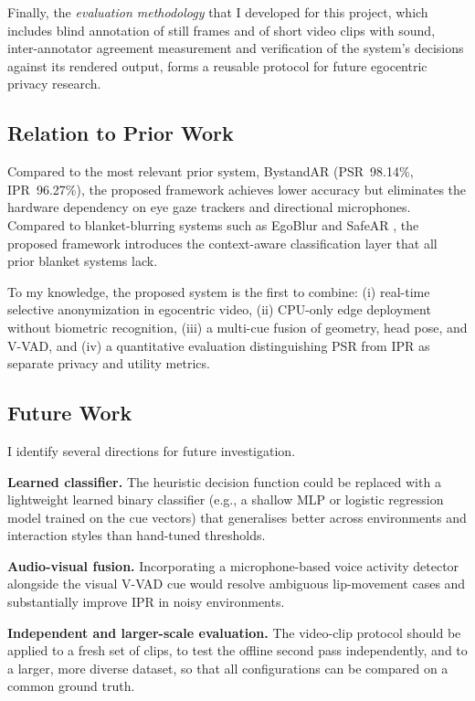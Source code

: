 Finally, the \emph{evaluation methodology} that I developed for this project,
which includes blind annotation of still frames and of short video clips with
sound, inter-annotator agreement measurement and verification of the system's
decisions against its rendered output, forms a reusable protocol for future
egocentric privacy research.

\subsection{Relation to Prior Work}
\label{sec:conclusion_prior}

Compared to the most relevant prior system, BystandAR \cite{bystandar} (PSR~98.14\%,
IPR~96.27\%), the proposed framework achieves lower accuracy but eliminates the
hardware dependency on eye gaze trackers and directional microphones. Compared to
blanket-blurring systems such as EgoBlur \cite{egoblur2023} and SafeAR
\cite{ref:safear2025}, the proposed framework introduces the context-aware
classification layer that all prior blanket systems lack.

To my knowledge, the proposed system is the first to combine:
(i) real-time selective anonymization in egocentric video,
(ii) CPU-only edge deployment without biometric recognition,
(iii) a multi-cue fusion of geometry, head pose, and V-VAD, and
(iv) a quantitative evaluation distinguishing PSR from IPR as separate privacy and
utility metrics.

\subsection{Future Work}
\label{sec:conclusion_future}

I identify several directions for future investigation.

\textbf{Learned classifier.} The heuristic decision function could be replaced with
a lightweight learned binary classifier (e.g., a shallow MLP or logistic regression
model trained on the cue vectors) that generalises better across environments and
interaction styles than hand-tuned thresholds.

\textbf{Audio-visual fusion.} Incorporating a microphone-based voice activity
detector alongside the visual V-VAD cue would resolve ambiguous lip-movement cases
and substantially improve IPR in noisy environments.

\textbf{Independent and larger-scale evaluation.} The video-clip protocol should
be applied to a fresh set of clips, to test the offline second pass independently,
and to a larger, more diverse dataset, so that all configurations can be compared on
a common ground truth.

